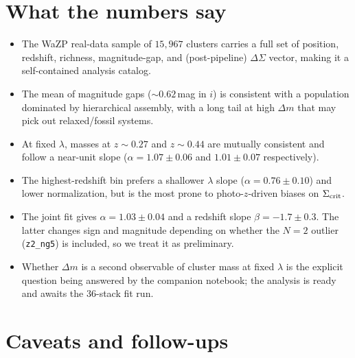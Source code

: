 \documentclass[11pt,a4paper]{article}
\newcommand{\DS}{\Delta\Sigma}
\newcommand{\dm}{\Delta m}
\begin{document}
\section{What the numbers say}

\begin{itemize}
\item The WaZP real-data sample of $15{,}967$ clusters carries a full set of
position, redshift, richness, magnitude-gap, and (post-pipeline) $\DS$ vector,
making it a self-contained analysis catalog.
\item The mean of magnitude gaps ($\sim 0.62$\,mag in $i$) is consistent with
a population dominated by hierarchical assembly, with a long tail at high
$\dm$ that may pick out relaxed/fossil systems.
\item At fixed $\lambda$, masses at $z\sim 0.27$ and $z\sim 0.44$ are
mutually consistent and follow a near-unit slope
($\alpha=1.07\pm0.06$ and $1.01\pm0.07$ respectively).
\item The highest-redshift bin prefers a shallower $\lambda$ slope
($\alpha=0.76\pm0.10$) and lower normalization, but is the most prone to
photo-$z$-driven biases on $\Sigma_{\rm crit}$.
\item The joint fit gives $\alpha = 1.03\pm0.04$ and a redshift slope
$\beta = -1.7\pm0.3$. The latter changes sign and magnitude depending on
whether the $N=2$ outlier (\texttt{z2\_ng5}) is included, so we treat it as
preliminary.
\item Whether $\dm$ is a second observable of cluster mass at fixed
$\lambda$ is the explicit question being answered by the companion
notebook; the analysis is ready and awaits the 36-stack fit run.
\end{itemize}

\section{Caveats and follow-ups}
\label{sec:caveats}
\end{document}
